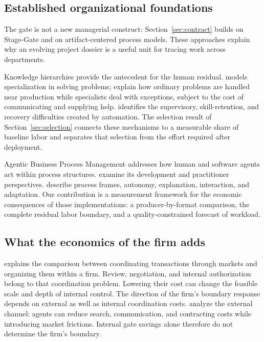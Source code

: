 \subsection{Established organizational foundations}

The gate is not a new managerial construct: Section~\ref{sec:contract} builds on Stage-Gate and on
artifact-centered process models. These approaches explain why an evolving project dossier
is a useful unit for tracing work across departments.

Knowledge hierarchies provide the antecedent for the human residual. \citet{garicano2000} models
specialization in solving problems; \citet[Sections~1 and~3]{garicano2015} explain
how ordinary problems are handled near production while specialists deal with exceptions, subject
to the cost of communicating and supplying help. \citet[pp.~775--777]{bainbridge1983} identifies the
supervisory, skill-retention, and recovery difficulties created by automation. The selection result of Section~\ref{sec:selection} connects these mechanisms to a measurable share of baseline labor and separates that
selection from the effort required after deployment.

Agentic Business Process Management addresses how human and software agents act within process
structures. \citet{vu2025} examine its development and practitioner perspectives.
\citet{calvanese2026} describe process frames, autonomy, explanation, interaction, and adaptation.
Our contribution is a measurement framework for the economic consequences of those implementations:
a producer-by-format comparison, the complete residual labor boundary, and a quality-constrained
forecast of workload.

\subsection{What the economics of the firm adds}

\citet[pp.~389--394]{coase1937} explains the comparison between coordinating transactions through
markets and organizing them within a firm. Review, negotiation, and internal authorization belong
to that coordination problem. Lowering their cost can change the feasible scale and depth of
internal control. The direction of the firm's boundary response depends on external as well as
internal coordination costs. \citet{shahidi2025} analyze the external channel: agents can reduce
search, communication, and contracting costs while introducing market frictions. Internal gate
savings alone therefore do not determine the firm's boundary.

